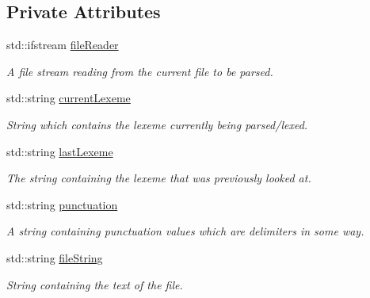 \subsection*{Private Attributes}
\begin{DoxyCompactItemize}
\item 
\hypertarget{class_lexer_adc8bdce9d027599208cd772a81b954d2}{}\label{class_lexer_adc8bdce9d027599208cd772a81b954d2} 
std\+::ifstream \hyperlink{class_lexer_adc8bdce9d027599208cd772a81b954d2}{file\+Reader}
\begin{DoxyCompactList}\small\item\em A file stream reading from the current file to be parsed. \end{DoxyCompactList}\item 
\hypertarget{class_lexer_aedfea368fa8e818b053df4f4cec803ba}{}\label{class_lexer_aedfea368fa8e818b053df4f4cec803ba} 
std\+::string \hyperlink{class_lexer_aedfea368fa8e818b053df4f4cec803ba}{current\+Lexeme}
\begin{DoxyCompactList}\small\item\em String which contains the lexeme currently being parsed/lexed. \end{DoxyCompactList}\item 
\hypertarget{class_lexer_a405095fbb33187d0cfff8b736970f4f1}{}\label{class_lexer_a405095fbb33187d0cfff8b736970f4f1} 
std\+::string \hyperlink{class_lexer_a405095fbb33187d0cfff8b736970f4f1}{last\+Lexeme}
\begin{DoxyCompactList}\small\item\em The string containing the lexeme that was previously looked at. \end{DoxyCompactList}\item 
\hypertarget{class_lexer_aab04ec42cbcd2e00f57fd4b9fd2255e4}{}\label{class_lexer_aab04ec42cbcd2e00f57fd4b9fd2255e4} 
std\+::string \hyperlink{class_lexer_aab04ec42cbcd2e00f57fd4b9fd2255e4}{punctuation}
\begin{DoxyCompactList}\small\item\em A string containing punctuation values which are delimiters in some way. \end{DoxyCompactList}\item 
\hypertarget{class_lexer_a8bec53e7c6adc2dd4f4ba5f6ac26d8b6}{}\label{class_lexer_a8bec53e7c6adc2dd4f4ba5f6ac26d8b6} 
std\+::string \hyperlink{class_lexer_a8bec53e7c6adc2dd4f4ba5f6ac26d8b6}{file\+String}
\begin{DoxyCompactList}\small\item\em String containing the text of the file. \end{DoxyCompactList}\item 

\end{DoxyCompactItemize}
